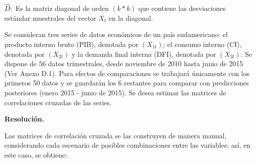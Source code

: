 $\hat{D}:$ Es la matriz diagonal de orden $(k* k)$ que contiene las desviaciones est\'{a}ndar muestrales del vector $X_{t}$ en la diagonal.

\begin{ejemplo}
Se consideran tres series de datos econ\'{o}micos de un pa\'{i}s sudamericano: el producto interno bruto (PIB), denotada por $\left(X_{1t} \right)$; el consumo interno (CI), denotada por $\left(X_{2t} \right)$ y la demanda final interna (DFI), denotada por $\left(X_{3t} \right)$. Se dispone de 56 datos trimestrales, desde noviembre de 2010 hasta junio de 2015 (Ver Anexo D.1). Para efectos de comparaciones se trabajar\'{a} \'{u}nicamente con los primeros 50 datos y se guardar\'{a}n los 6 restantes para comparar con predicciones posteriores (enero 2015 - junio de 2015). Se desea estimar las matrices de correlaciones cruzadas de las series.
\end{ejemplo}

\textbf{Resoluci\'{o}n.}

Las matrices de correlaci\'{o}n cruzada se las construyen de manera manual, considerando cada escenario de posibles combinaciones entre las variables; as\'{i}, en este caso, se obtiene:


